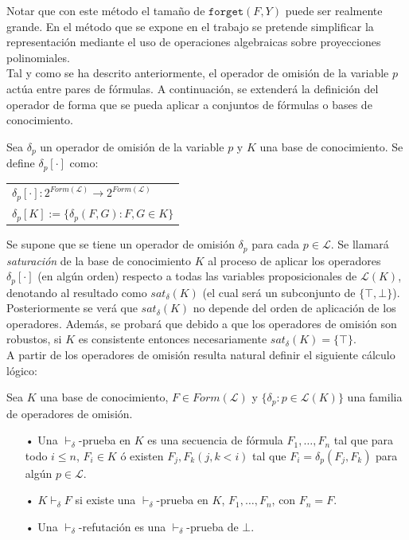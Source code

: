 \vspace{0.5cm}

Notar que con este método el tamaño de $\texttt{forget}(F,Y)$ puede ser realmente grande. En el método que se expone en el trabajo se pretende simplificar la representación mediante el uso de operaciones algebraicas sobre proyecciones polinomiales.\\

Tal y como se ha descrito anteriormente, el operador de omisión de la variable $p$ actúa entre pares de fórmulas. A continuación, se extenderá la definición del operador de forma que se pueda aplicar a conjuntos de fórmulas o bases de conocimiento.

 Sea $\delta_p$ un operador de omisión de la variable $p$ y $K$ una base de conocimiento. Se define $\delta_p [\cdot ]$ como:\\

\begin{tabular}{l}
$\delta_p [\cdot ] : 2^{Form(\mathcal{L})} \rightarrow 2^{Form(\mathcal{L})}$ \\
$\delta_p [K] := \{ \delta_p (F,G) : F,G \in K \}$
\end{tabular}

\vspace{0.5cm}

 Se supone que se tiene un operador de omisión $\delta_p$ para cada $p\in \mathcal{L}$. Se llamará \textit{saturación} de la base de conocimiento $K$ al proceso de aplicar los operadores $\delta_p [\cdot ]$ (en algún orden) respecto a todas las variables proposicionales de $\mathcal{L}(K)$, denotando al resultado como $sat_{\delta}(K)$ (el cual será un subconjunto de $\{ \top , \bot \}$).\\

Posteriormente se verá que $sat_{\delta}(K)$ no depende del orden de aplicación de los operadores. Además, se probará que debido a que los operadores de omisión son robustos, si $K$ es consistente entonces necesariamente $sat_{\delta}(K)=\{ \top \}$.\\

A partir de los operadores de omisión resulta natural definir el siguiente cálculo lógico:

 \label{def:prueba} Sea $K$ una base de conocimiento, $F\in Form(\mathcal{L})$ y $\{ \delta_p : p \in \mathcal{L}(K) \}$ una familia de operadores de omisión.
\begin{itemize}
\item[•]Una  $\vdash_{\delta}$-prueba en $K$ es una secuencia de fórmula $F_1, \dots ,F_n$ tal que para todo $i \leq n$, $F_i \in K$ ó existen $F_j , F_k (j,k < i)$ tal que $F_i = \delta_p (F_j , F_k)$ para algún $p \in \mathcal{L}$.
\item[•] $K \vdash_{\delta} F$ si existe una $\vdash_{\delta}$-prueba en $K$, $F_1, \dots ,F_n$, con $F_n = F$.
\item[•] Una $\vdash_{\delta}$-refutación es una $\vdash_{\delta}$-prueba de $\bot$.
\end{itemize}

